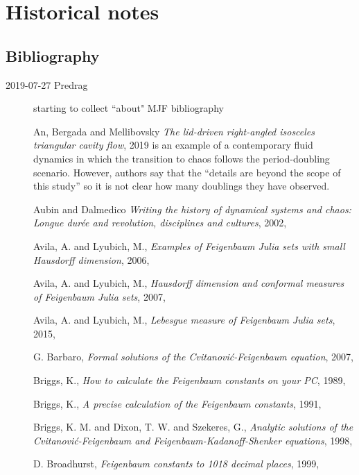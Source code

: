

\chapter{Historical notes}
\label{c-history}

\section{Bibliography}
\label{sect:Others}

\begin{description}
\item[2019-07-27 Predrag]
starting to collect ``about" MJF bibliography

{An, Bergada and Mellibovsky}
{\em The lid-driven right-angled isosceles triangular cavity flow},
{2019}
is an example of a contemporary fluid dynamics in which the transition to
chaos follows the period-doubling scenario. However, authors say that the
``details are beyond the scope of this study'' so it is not clear how
many doublings they have observed.

Aubin and Dalmedico
{\em Writing the history of dynamical systems and chaos: {Longue}
dur{\'{e}}e and revolution, disciplines and cultures},
{2002},

{Avila, A. and Lyubich, M.},
  {\em Examples of {Feigenbaum Julia} sets with small {Hausdorff} dimension},
{2006},

{Avila, A. and Lyubich, M.},
  {\em Hausdorff dimension and conformal measures of {Feigenbaum Julia} sets},
{2007},

{Avila, A. and Lyubich, M.},
{\em Lebesgue measure of Feigenbaum Julia sets},
{2015},

{G. Barbaro},
{\em Formal solutions of the {Cvitanovi{\'c}-Feigenbaum} equation},
{2007},

{Briggs, K.},
{\em How to calculate the {Feigenbaum} constants on your {PC}},
{1989},

{Briggs, K.},
{\em A precise calculation of the {Feigenbaum} constants},
{1991},

{Briggs, K. M. and Dixon, T. W. and Szekeres, G.},
{\em Analytic solutions of the {Cvitanovi{\'c}-Feigenbaum} and {Feigenbaum-Kadanoff-Shenker} equations},
{1998},

{D. Broadhurst},
{\em Feigenbaum constants to 1018 decimal places},
{1999},


\end{description}
